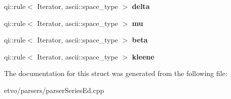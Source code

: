 \begin{DoxyCompactItemize}
qi\+::rule$<$ Iterator, ascii\+::space\+\_\+type $>$ {\bfseries delta}
\item 
\mbox{\label{structparseseriesed_1_1calculator_a4124d1a64af9871e2c65d13c4593ddad}} 
qi\+::rule$<$ Iterator, ascii\+::space\+\_\+type $>$ {\bfseries mu}
\item 
\mbox{\label{structparseseriesed_1_1calculator_a84db848763cf5b78e6939a98af34ea50}} 
qi\+::rule$<$ Iterator, ascii\+::space\+\_\+type $>$ {\bfseries beta}
\item 
\mbox{\label{structparseseriesed_1_1calculator_ae716a0e0be96d22be033a01607b29dcc}} 
qi\+::rule$<$ Iterator, ascii\+::space\+\_\+type $>$ {\bfseries kleene}
\end{DoxyCompactItemize}


The documentation for this struct was generated from the following file\+:\begin{DoxyCompactItemize}
\item 
etvo/parsers/parser\+Series\+Ed.\+cpp\end{DoxyCompactItemize}
